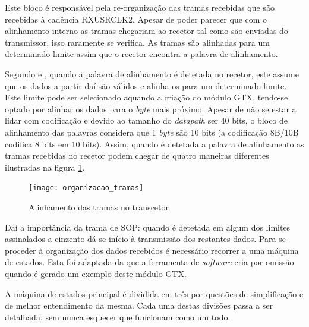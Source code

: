 \documentclass[11pt,a4paper]{article}
\begin{document}
	
	Este bloco é responsável pela re-organização das tramas recebidas que são recebidas à cadência RXUSRCLK2. Apesar de poder parecer que com o alinhamento interno as tramas chegariam ao recetor tal como são enviadas do transmissor, isso raramente se verifica. As tramas são alinhadas para um determinado limite assim que o recetor encontra a palavra de alinhamento. %
	
	Segundo \cite{R022} e \cite{R011}, quando a palavra de alinhamento é detetada no recetor, este assume que os dados a partir daí são válidos e alinha-os para um determinado limite. Este limite pode ser selecionado aquando a criação do módulo GTX, tendo-se optado por alinhar os dados para o \textit{byte} mais próximo. Apesar de não se estar a lidar com codificação e devido ao tamanho do \textit{datapath} ser 40 bits, o bloco de alinhamento das palavras considera que 1 \textit{byte} são 10 bits (a codificação 8B/10B codifica 8 bits em 10 bits). Assim, quando é detetada a palavra de alinhamento as tramas recebidas no recetor podem chegar de quatro maneiras diferentes ilustradas na figura \ref{fig:alinhamento_tramas_gtx}.
	
	
	\begin{figure}[h!]
		\begin{center}
			\leavevmode
			\texttt{[image: organizacao\_tramas]}
			\caption[Alinhamento das tramas no transcetor]{Alinhamento das tramas no transcetor}
			\label{fig:alinhamento_tramas_gtx}
		\end{center}
	\end{figure}
	
	Daí a importância da trama de SOP: quando é detetada em algum dos limites assinalados a cinzento dá-se início à transmissão dos restantes dados. Para se proceder à organização dos dados recebidos é necessário recorrer a uma máquina de estados. Esta foi adaptada da que a ferramenta de \textit{software} cria por omissão quando é gerado um exemplo deste módulo GTX.
	
	A máquina de estados principal é dividida em três por questões de simplificação e de melhor entendimento da mesma. Cada uma destas divisões passa a ser detalhada, sem nunca esquecer que funcionam como um todo.
	
\end{document}
